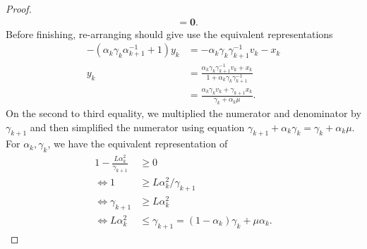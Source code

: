 \documentclass[12pt]{article}
\begin{document}
\begin{proof}
\begin{align*}
            &= \mathbf 0. 
        \end{align*}
        Before finishing, re-arranging should give use the equivalent representations 
        \begin{align*}
            -(\alpha_k \gamma_k\alpha_{k + 1}^{-1} + 1)y_k
            &= 
            - \alpha_k \gamma_k \gamma_{k + 1}^{-1}v_k - x_k
            \\
            y_k &= 
            \frac{
                \alpha_k \gamma_k \gamma_{k + 1}^{-1}v_k + x_k
            }{1 + \alpha_k \gamma_k \gamma_{k + 1}^{-1}}
            \\
            &=  
            \frac{\alpha_k \gamma_k v_k + \gamma_{k + 1}x_k}{\gamma_k + \alpha_k \mu}. 
        \end{align*}
        On the second to third equality, we multiplied the numerator and denominator by $\gamma_{k + 1}$ and then simplified the numerator using equation $\gamma_{k + 1} + \alpha_k \gamma_k = \gamma_k + \alpha_k \mu$. 
        For $\alpha_k, \gamma_k$, we have the equivalent representation of 
        \begin{align*}
            1 - \frac{L \alpha_k^2}{\gamma_{k + 1}}
            &\ge 0
            \\
            \iff 1 &\ge L \alpha_k^2 / \gamma_{k + 1}
            \\
            \iff 
            \gamma_{k + 1} &\ge L \alpha_k^2
            \\
            \iff 
            L\alpha_k^2 
            &\le
            \gamma_{k + 1} = (1 - \alpha_k)\gamma_k + \mu \alpha_k. 
        \end{align*}
    \end{proof}
    
\end{document}
